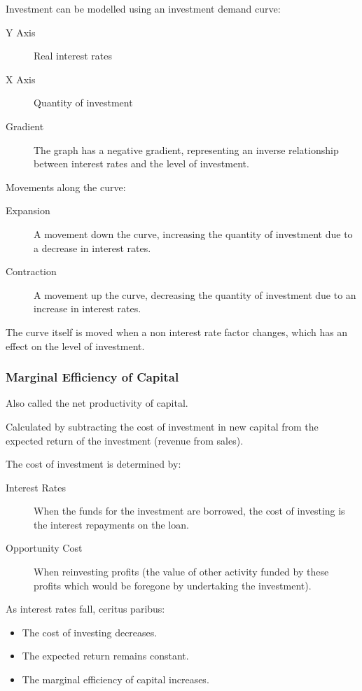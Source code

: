 \documentclass[a4paper,11pt]{article}
\begin{document}

Investment can be modelled using an investment demand curve:

\begin{description}
\item [Y Axis] Real interest rates
\item [X Axis] Quantity of investment
\item [Gradient] The graph has a negative gradient, representing an inverse
	relationship between interest rates and the level of investment.
\end{description}

Movements along the curve:

\begin{description}
\item [Expansion] A movement down the curve, increasing the quantity of
	investment due to a decrease in interest rates.
\item [Contraction] A movement up the curve, decreasing the quantity of
	investment due to an increase in interest rates.
\end{description}

The curve itself is moved when a non interest rate factor changes, which has an
effect on the level of investment.


\subsubsection{Marginal Efficiency of Capital}

Also called the net productivity of capital.

Calculated by subtracting the cost of investment in new capital from the
expected return of the investment (revenue from sales).

The cost of investment is determined by:

\begin{description}
\item [Interest Rates] When the funds for the investment are borrowed, the cost
	of investing is the interest repayments on the loan.
\item [Opportunity Cost] When reinvesting profits (the value of other activity
	funded by these profits which would be foregone by undertaking the
	investment).
\end{description}

As interest rates fall, ceritus paribus:

\begin{itemize}
\item The cost of investing decreases.
\item The expected return remains constant.
\item The marginal efficiency of capital increases.
\end{itemize}
\end{document}
